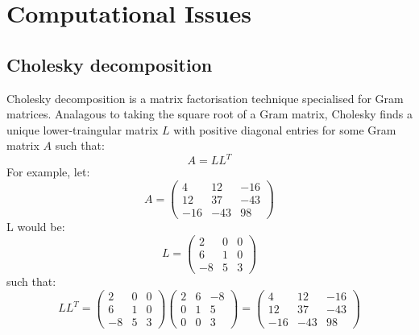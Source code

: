\section{Computational Issues}


\subsection{Cholesky decomposition}
Cholesky decomposition \cite{gp-ml} is a matrix factorisation technique specialised for Gram matrices. Analagous to taking the square root of a Gram matrix, Cholesky finds a unique lower-traingular matrix $L$ with positive diagonal entries for some Gram matrix $A$ such that:
\begin{equation} \label{eq:cholesky-factor}
    A = LL^T
\end{equation}
For example, let:
\begin{equation*}
    A = \begin{pmatrix}
        4 & 12 & -16 \\ 
        12 & 37 & -43 \\
        -16 & -43 & 98
    \end{pmatrix}
\end{equation*}
L would be:
\begin{equation*}
    L = \begin{pmatrix}
        2 & 0 & 0 \\
        6 & 1 & 0 \\
        -8 & 5 & 3 
    \end{pmatrix}
\end{equation*}
such that:
\begin{equation*}
    LL^T = \begin{pmatrix}
        2 & 0 & 0 \\
        6 & 1 & 0 \\
        -8 & 5 & 3 
    \end{pmatrix} \begin{pmatrix}
        2 & 6 & -8 \\
        0 & 1 & 5 \\
        0 & 0 & 3 
    \end{pmatrix} = \begin{pmatrix}
        4 & 12 & -16 \\ 
        12 & 37 & -43 \\
        -16 & -43 & 98
    \end{pmatrix}
\end{equation*}

